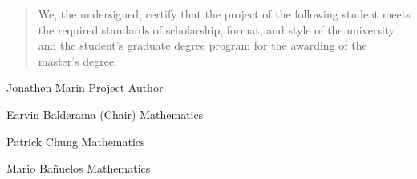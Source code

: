 \documentclass[12pt,leqno]{article}\usepackage[pdftex]{graphicx}\usepackage[usenames,dvipsnames]{xcolor}
\theoremstyle{remark}
\begin{document}
\noindent
\begin{quote}
We, the undersigned, certify that the project of the following student meets the required standards of scholarship, format, and style of the university and the student's graduate degree program for the awarding of the master's degree.
\end{quote}

\vskip 0.5in

\begin{center}
Jonathen Marin  %
\vskip -0.1in
\makebox[\textwidth]{\hspace{4pc}\hrulefill\hspace{4pc}}
Project Author
\end{center}

\vskip 0.5in

\begin{center}
 \makebox[\textwidth]{\hspace{2pc}\hrulefill\hspace{2pc}}
 \end{center}
 \vskip -0.2in
 \hspace{2pc}%
Earvin Balderama (Chair) \hfill Mathematics  \hspace{2pc}


\vskip 0.3in
\begin{center}
 \makebox[\textwidth]{\hspace{2pc}\hrulefill\hspace{2pc}}
 \end{center}
 \vskip -0.2in
 \hspace{2pc}%
Patrick Chung \hfill Mathematics  \hspace{2pc}

\vskip 0.3in
\begin{center}
\makebox[\textwidth]{\hspace{2pc}\hrulefill\hspace{2pc}}
\end{center}
\vskip -0.2in
\hspace{2pc}%
Mario Bañuelos \hfill Mathematics \hspace{2pc}   %
\end{document}
